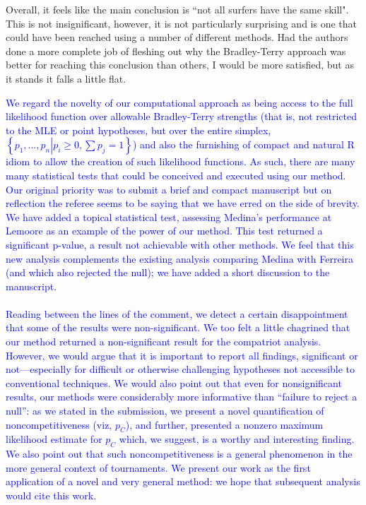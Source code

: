 \documentclass[12pt]{article}
\begin{document}
Overall, it feels like the main conclusion is ``not all surfers have
the same skill". This is not insignificant, however, it is not
particularly surprising and is one that could have been reached using
a number of different methods. Had the authors done a more complete
job of fleshing out why the Bradley-Terry approach was better for
reaching this conclusion than others, I would be more satisfied, but
as it stands it falls a little flat.

\textcolor{blue}{We regard the novelty of our computational approach
  as being access to the full likelihood function over allowable
  Bradley-Terry strengths (that is, not restricted to the MLE or point
  hypotheses, but over the entire simplex, $\left\lbrace
  p_1,\ldots,p_n\left|p_i\geq 0,\sum p_j=1\right.\right\rbrace$) and
  also the furnishing of compact and natural R idiom to allow the
  creation of such likelihood functions.  As such, there are many many
  statistical tests that could be conceived and executed using our
  method.  Our original priority was to submit a brief and compact
  manuscript but on reflection the referee seems to be saying that we
  have erred on the side of brevity.  We have added a topical
  statistical test, assessing Medina's performance at Lemoore as an
  example of the power of our method.  This test returned a
  significant p-value, a result not achievable with other methods.  We
  feel that this new analysis complements the existing analysis
  comparing Medina with Ferreira (and which also rejected the null);
  we have added a short discussion to the manuscript.  \\ \\ Reading
  between the lines of the comment, we detect a certain disappointment
  that some of the results were non-significant.  We too felt a little
  chagrined that our method returned a non-significant result for the
  compatriot analysis.  However, we would argue that it is important
  to report all findings, significant or not---especially for
  difficult or otherwise challenging hypotheses not accessible to
  conventional techniques.  We would also point out that even for
  nonsignificant results, our methods were considerably more
  informative than ``failure to reject a null'': as we stated in the
  submission, we present a novel quantification of noncompetitiveness
  (viz, $p_C$), and further, presented a nonzero maximum likelihood
  estimate for $p_C$ which, we suggest, is a worthy and interesting
  finding.  We also point out that such noncompetitiveness is a
  general phenomenon in the more general context of tournaments.  We
  present our work as the first application of a novel and very
  general method: we hope that subsequent analysis would cite this
  work.}
\end{document}
